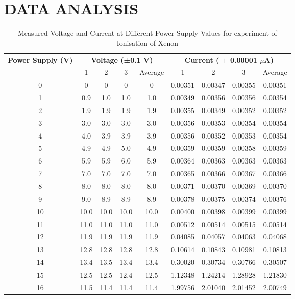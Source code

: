 \documentclass[a4paper,11pt]{article}
\begin{document}
\section*{\center DATA ANALYSIS}
\label{sec:DATA ANALYSIS}
\begin{table}[h!]
\small
\centering
\begin{tabular}{ccccccccc}
\toprule
\multicolumn{1}{c}{\textbf{Power Supply (V)}} & \multicolumn{4}{c}{\textbf{Voltage (±0.1 V)}} & \multicolumn{4}{c}{\textbf{Current ( $\pm$ 0.00001 $\mu$A)}} \\
\cmidrule(lr){2-5} \cmidrule(lr){6-9}
& 1 & 2 & 3 & Average & 1 & 2 & 3 & Average \\
\midrule
0 & 0 & 0 & 0 & 0 & 0.00351 & 0.00347 & 0.00355 & 0.00351 \\
1 & 0.9 & 1.0 & 1.0 & 1.0 & 0.00349 & 0.00356 & 0.00356 & 0.00354 \\
2 & 1.9 & 1.9 & 1.9 & 1.9 & 0.00355 & 0.00349 & 0.00352 & 0.00352 \\
3 & 3.0 & 3.0 & 3.0 & 3.0 & 0.00356 & 0.00353 & 0.00354 & 0.00354 \\
4 & 4.0 & 3.9 & 3.9 & 3.9 & 0.00356 & 0.00352 & 0.00353 & 0.00354 \\
5 & 4.9 & 4.9 & 5.0 & 4.9 & 0.00359 & 0.00359 & 0.00358 & 0.00359 \\
6 & 5.9 & 5.9 & 6.0 & 5.9 & 0.00364 & 0.00363 & 0.00363 & 0.00363 \\
7 & 7.0 & 7.0 & 7.0 & 7.0 & 0.00365 & 0.00366 & 0.00367 & 0.00366 \\
8 & 8.0 & 8.0 & 8.0 & 8.0 & 0.00371 & 0.00370 & 0.00369 & 0.00370 \\
9 & 9.0 & 8.9 & 8.9 & 8.9 & 0.00378 & 0.00375 & 0.00374 & 0.00376 \\
10 & 10.0 & 10.0 & 10.0 & 10.0 & 0.00400 & 0.00398 & 0.00399 & 0.00399 \\
11 & 11.0 & 11.0 & 11.0 & 11.0 & 0.00512 & 0.00514 & 0.00515 & 0.00514 \\
12 & 11.9 & 11.9 & 11.9 & 11.9 & 0.04085 & 0.04057 & 0.04063 & 0.04068 \\
13 & 12.8 & 12.8 & 12.8 & 12.8 & 0.10614 & 0.10843 & 0.10981 & 0.10813 \\
14 & 13.4 & 13.5 & 13.4 & 13.4 & 0.30020 & 0.30734 & 0.30766 & 0.30507 \\
15 & 12.5 & 12.5 & 12.4 & 12.5 & 1.12348 & 1.24214 & 1.28928 & 1.21830 \\
16 & 11.5 & 11.4 & 11.4 & 11.4 & 1.99756 & 2.01040 & 2.01452 & 2.00749 \\
\bottomrule
\end{tabular}
\caption{Measured Voltage and Current at Different Power Supply Values for experiment of Ionisation of Xenon}
\label{tab:measurements}
\end{table}
\end{document}
